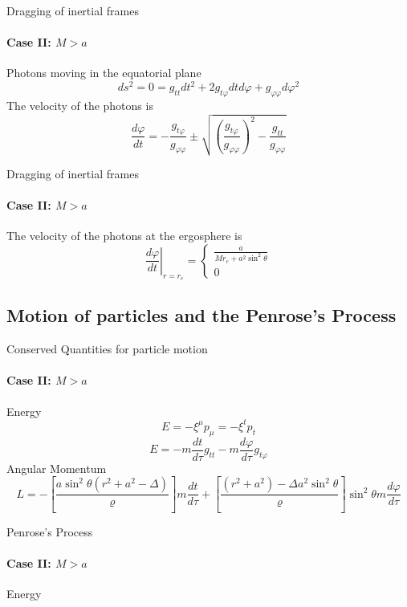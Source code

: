 \documentclass{beamer}
\begin{document}
     \begin{darkframes}
     	
        \begin{frame}{Dragging of inertial frames}
       	\framesubtitle{Case II: $M>a$}
            Photons moving in the equatorial plane
	$$ds^{2}= 0 = g_{tt} dt^{2} + 2g_{t\varphi} dt d\varphi + g_{\varphi\varphi} d\varphi^{2}$$
    		\pause
            The velocity of the photons is
            $$\frac{d\varphi}{dt}=-\frac{g_{t\varphi}}{g_{\varphi\varphi}}\pm\sqrt{\left(\frac{g_{t\varphi}}{g_{\varphi\varphi}}\right)^{2}-\frac{g_{tt}}{g_{\varphi\varphi}}}$$
        \end{frame}
        
        \begin{frame}{Dragging of inertial frames}
       	\framesubtitle{Case II: $M>a$}
            The velocity of the photons at the ergosphere is
            \begin{equation*}
            \left.\frac{d\varphi}{dt}\right|_{r=r_{e}}=\left\{ \begin{array}{c}
            \frac{a}{Mr_{e}+a^{2}\sin^{2}\theta}\\
            0
            \end{array}\right.
            \end{equation*}
        \end{frame}
    
    \subsection{Motion of particles and the Penrose's Process}
        \begin{frame}{Conserved Quantities for particle motion}
       	\framesubtitle{Case II: $M>a$}
            Energy
            $$E=-\xi^{\mu}p_{\mu}=-\xi^{t}p_{t}$$
            \pause
            $$E=-m\frac{dt}{d\tau}g_{tt}-m\frac{d\varphi}{d\tau}g_{t\varphi}$$
            \pause
            Angular Momentum
            \footnotesize
            $$L=-\left[\frac{a\sin^{2}\theta\left(r^{2}+a^{2}-\Delta\right)}{\varrho}\right]m\frac{dt}{d\tau}+\left[\frac{\left(r^{2}+a^{2}\right)-\Delta a^{2}\sin^{2}\theta}{\varrho}\right]\sin^{2}\theta m\frac{d\varphi}{d\tau}$$
        \end{frame}
        
        \begin{frame}{Penrose's Process}
       	\framesubtitle{Case II: $M>a$}
           Energy\\
           \bigskip
           

\end{frame}
\end{darkframes}
\end{document}
